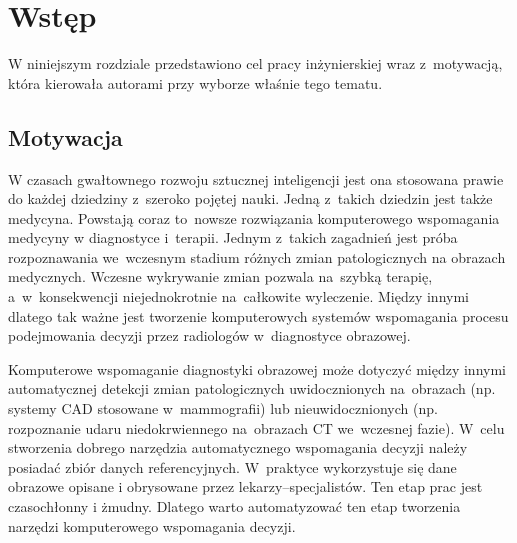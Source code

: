 \documentclass[a4paper,11pt,twoside,openright]{report}
\theoremstyle{definition}
\begin{document}
\thispagestyle{empty}
\newpage

\null\thispagestyle{empty}\newpage


\tableofcontents
\thispagestyle{empty}


\null\thispagestyle{empty}\newpage
\pagestyle{fancy}
\setcounter{page}{11}


\chapter*{Wstęp}

W niniejszym rozdziale przedstawiono cel pracy inżynierskiej wraz z~motywacją,
która kierowała autorami przy wyborze właśnie tego tematu.

\section*{Motywacja}

W czasach gwałtownego rozwoju sztucznej inteligencji jest ona stosowana prawie
do każdej dziedziny z~szeroko pojętej nauki. Jedną z~takich dziedzin jest także medycyna.
Powstają coraz to~nowsze rozwiązania komputerowego wspomagania medycyny w diagnostyce i~terapii.
Jednym z~takich zagadnień jest próba rozpoznawania we~wczesnym stadium różnych zmian
patologicznych na obrazach medycznych. Wczesne wykrywanie zmian pozwala
na~szybką terapię, a~w~konsekwencji niejednokrotnie na~całkowite wyleczenie. Między innymi dlatego
tak ważne jest tworzenie komputerowych systemów wspomagania procesu podejmowania
decyzji przez radiologów w~diagnostyce obrazowej.

Komputerowe wspomaganie diagnostyki obrazowej może dotyczyć między innymi automatycznej
detekcji zmian patologicznych uwidocznionych na~obrazach (np. systemy CAD stosowane
w~mammografii) lub nieuwidocznionych (np. rozpoznanie udaru niedokrwiennego na~obrazach
CT we~wczesnej fazie). W~celu stworzenia dobrego narzędzia automatycznego wspomagania
decyzji należy posiadać zbiór danych referencyjnych. W~praktyce wykorzystuje się
dane obrazowe opisane i obrysowane przez lekarzy--specjalistów. Ten etap prac
jest czasochłonny i żmudny. Dlatego warto automatyzować ten etap tworzenia narzędzi
komputerowego wspomagania decyzji.
\end{document}
